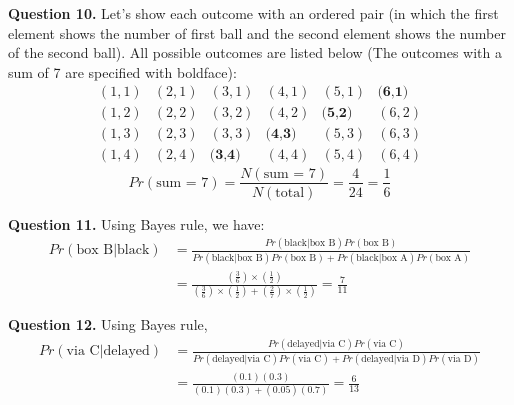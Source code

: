 \documentclass[10pt,a4paper]{article}
\newcommand{\question}[1]{\bigskip \noindent \textbf{Question #1.}}
\begin{document}
\question{10} Let's show each outcome with an ordered pair (in which the first element shows the number of first ball and the second element shows the number of the second ball). All possible outcomes are listed below (The outcomes with a sum of 7 are specified with boldface):
\begin{equation*}
\begin{matrix}
(1,1) & (2,1) & (3,1) & (4,1) & (5,1) & \textbf{(6,1)} \\
(1,2) & (2,2) & (3,2) & (4,2) & \textbf{(5,2)} & (6,2) \\
(1,3) & (2,3) & (3,3) & \textbf{(4,3)} & (5,3) & (6,3) \\
(1,4) & (2,4) & \textbf{(3,4)} & (4,4) & (5,4) & (6,4)
\end{matrix}
\end{equation*}
\begin{equation*}
Pr (\text{sum = 7}) = \frac{N(\text{sum = 7})}{N(\text{total})} = \frac{4}{24} = \frac{1}{6}
\end{equation*}

\question{11} Using Bayes rule, we have:
\begin{align*}
Pr (\text{box B} | \text{black}) &= \frac{Pr(\text{black} | \text{box B}) Pr(\text{box B})}{Pr(\text{black} | \text{box B}) Pr(\text{box B}) + Pr(\text{black} | \text{box A}) Pr(\text{box A})} \\
&=\frac{(\frac{3}{6}) \times (\frac{1}{2})}{(\frac{3}{6}) \times (\frac{1}{2}) + (\frac{2}{7}) \times (\frac{1}{2})} = \frac{7}{11}
\end{align*}

\question{12} Using Bayes rule,
\begin{align*}
Pr (\text{via C} | \text{delayed}) &= \frac{Pr(\text{delayed} | \text{via C}) Pr(\text{via C})}{Pr(\text{delayed} | \text{via C}) Pr(\text{via C}) + Pr(\text{delayed} | \text{via D}) Pr(\text{via D})} \\
& = \frac{(0.1)(0.3)}{(0.1)(0.3) + (0.05)(0.7)} = \frac{6}{13}
\end{align*}
\end{document}
